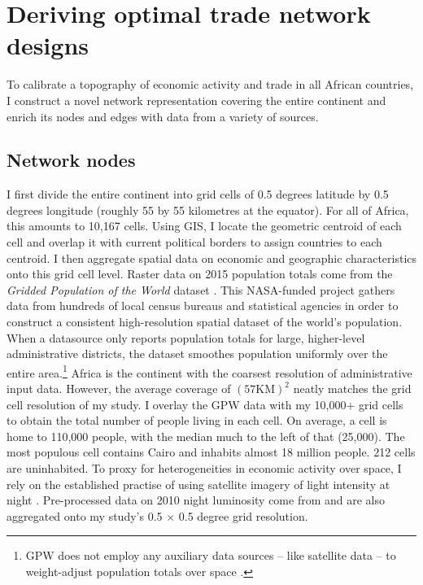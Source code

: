 \documentclass[11pt, oneside]{article}   	%
\begin{document}

\section{Deriving optimal trade network designs}
\label{chapter:calibration}
To calibrate a topography of economic activity and trade in all African countries, I construct a novel network representation covering the entire continent and enrich its nodes and edges with data from a variety of sources.

\subsection{Network nodes}
I first divide the entire continent into grid cells of 0.5 degrees latitude by 0.5 degrees longitude (roughly 55 by 55 kilometres at the equator). For all of Africa, this amounts to 10,167 cells. Using GIS, I locate the geometric centroid of each cell and overlap it with current political borders to assign countries to each centroid. I then aggregate spatial data on economic and geographic characteristics onto this grid cell level. Raster data on 2015 population totals come from the \textit{Gridded Population of the World} dataset \citep[GPW,][]{SocioeconomicDataandApplicationsCenter_GriddedPopulationWorld_2016}. This NASA-funded project gathers data from hundreds of local census bureaus and statistical agencies in order to construct a consistent high-resolution spatial dataset of the world's population. When a datasource only reports population totals for large, higher-level administrative districts, the dataset smoothes population uniformly over the entire area.\footnote{GPW does not employ any auxiliary data sources -- like satellite data -- to weight-adjust population totals over space \citep{Doxsey-Whitfield_TakingAdvantageImproved_2015}.} Africa is the continent with the coarsest resolution of administrative input data. However, the average coverage of $(57\textrm{KM})^{2}$ neatly matches the grid cell resolution of my study. I overlay the GPW data with my 10,000+ grid cells to obtain the total number of people living in each cell. On average, a cell is home to 110,000 people, with the median much to the left of that (25,000). The most populous cell contains Cairo and inhabits almost 18 million people. 212 cells are uninhabited. To proxy for heterogeneities in economic activity over space, I rely on the established practise of using satellite imagery of light intensity at night \citep{Henderson_MeasuringEconomicGrowth_2012}. Pre-processed data on 2010 night luminosity come from \cite{Henderson_GlobalSpatialDistribution_2018} and are also aggregated onto my study's 0.5 $\times$ 0.5 degree grid resolution.
\end{document}
